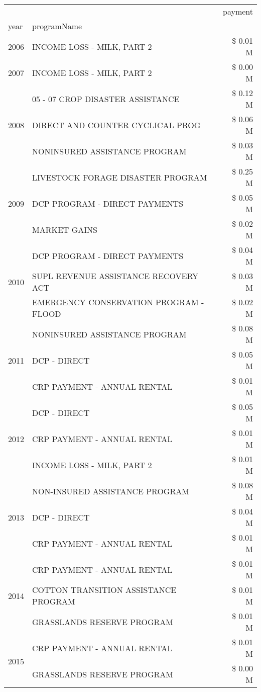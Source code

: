 \begin{tabular}{llr}
\toprule
 &  & payment \\
year & programName &  \\
\midrule
2006 & INCOME LOSS - MILK, PART 2 & \$ 0.01 M \\
\cline{1-3}
2007 & INCOME LOSS - MILK, PART 2 & \$ 0.00 M \\
\cline{1-3}
\multirow[t]{3}{*}{2008} & 05 - 07 CROP DISASTER ASSISTANCE & \$ 0.12 M \\
 & DIRECT AND COUNTER CYCLICAL PROG & \$ 0.06 M \\
 & NONINSURED ASSISTANCE PROGRAM & \$ 0.03 M \\
\cline{1-3}
\multirow[t]{3}{*}{2009} & LIVESTOCK FORAGE DISASTER  PROGRAM & \$ 0.25 M \\
 & DCP PROGRAM - DIRECT PAYMENTS & \$ 0.05 M \\
 & MARKET GAINS & \$ 0.02 M \\
\cline{1-3}
\multirow[t]{3}{*}{2010} & DCP PROGRAM - DIRECT PAYMENTS & \$ 0.04 M \\
 & SUPL REVENUE ASSISTANCE RECOVERY ACT & \$ 0.03 M \\
 & EMERGENCY CONSERVATION PROGRAM - FLOOD & \$ 0.02 M \\
\cline{1-3}
\multirow[t]{3}{*}{2011} & NONINSURED ASSISTANCE PROGRAM & \$ 0.08 M \\
 & DCP - DIRECT & \$ 0.05 M \\
 & CRP PAYMENT - ANNUAL RENTAL & \$ 0.01 M \\
\cline{1-3}
\multirow[t]{3}{*}{2012} & DCP - DIRECT & \$ 0.05 M \\
 & CRP PAYMENT - ANNUAL RENTAL & \$ 0.01 M \\
 & INCOME LOSS - MILK, PART 2 & \$ 0.01 M \\
\cline{1-3}
\multirow[t]{3}{*}{2013} & NON-INSURED ASSISTANCE PROGRAM & \$ 0.08 M \\
 & DCP - DIRECT & \$ 0.04 M \\
 & CRP PAYMENT - ANNUAL RENTAL & \$ 0.01 M \\
\cline{1-3}
\multirow[t]{3}{*}{2014} & CRP PAYMENT - ANNUAL RENTAL & \$ 0.01 M \\
 & COTTON TRANSITION ASSISTANCE PROGRAM & \$ 0.01 M \\
 & GRASSLANDS RESERVE PROGRAM & \$ 0.01 M \\
\cline{1-3}
\multirow[t]{3}{*}{2015} & CRP PAYMENT - ANNUAL RENTAL & \$ 0.01 M \\
 & GRASSLANDS RESERVE PROGRAM & \$ 0.00 M \\

\end{tabular}
